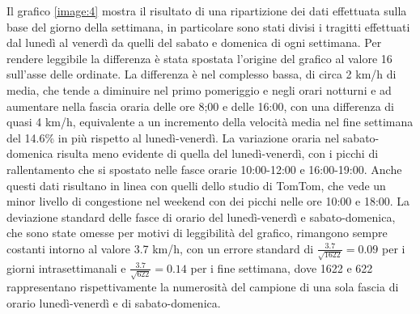 
Il grafico \ref{image:4} mostra il risultato di una ripartizione dei dati effettuata sulla base del giorno della settimana, in particolare sono stati divisi i tragitti effettuati dal lunedì al venerdì da quelli del sabato e domenica di ogni settimana. Per rendere leggibile la differenza è stata spostata l'origine del grafico al valore 16 sull'asse delle ordinate. La differenza è nel complesso bassa, di circa 2 km/h di media, che tende a diminuire nel primo pomeriggio e negli orari notturni e ad aumentare nella fascia oraria delle ore 8;00 e delle 16:00, con una differenza di quasi 4 km/h, equivalente a un incremento della velocità media nel fine settimana del 14.6\% in più rispetto al lunedì-venerdì. La variazione oraria nel sabato-domenica risulta meno evidente di quella del lunedì-venerdì, con i picchi di rallentamento che si spostato nelle fasce orarie 10:00-12:00 e 16:00-19:00. Anche questi dati risultano in linea con quelli dello studio di TomTom, che vede un minor livello di congestione nel weekend con dei picchi nelle ore 10:00 e 18:00. La deviazione standard delle fasce di orario del lunedì-venerdì e sabato-domenica, che sono state omesse per motivi di leggibilità del grafico, rimangono sempre costanti intorno al valore 3.7 km/h, con un errore standard di $\frac{3.7}{\sqrt{1622}} = 0.09$ per i giorni intrasettimanali e $\frac{3.7}{\sqrt{622}} = 0.14$ per i fine settimana, dove 1622 e 622 rappresentano rispettivamente la numerosità del campione di una sola fascia di orario lunedì-venerdì e di sabato-domenica.

